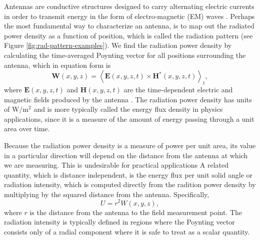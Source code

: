 Antennas are conductive structures designed to carry alternating electric currents in order to transmit energy in the form of electro-magnetic (EM) waves \cite{balanis2015antenna}. Perhaps the most fundamental way to characterize an antenna, is to map out the radiated power density as a function of position, which is called the radiation pattern (see Figure \ref{fig:rad-pattern-examples}). We find the radiation power density by calculating the time-averaged Poynting vector for all positions surrounding the antenna, which in equation form is
\begin{equation}
    \mathbf{W}(x,y,z) = \left<\mathbf{E}(x,y,z,t)\times\mathbf{H}^\ast(x,y,z,t)\right>_t,
\end{equation}
where $\mathbf{E}(x,y,z,t)$ and $\mathbf{H}(x,y,z,t)$ are the time-dependent electric and magnetic fields produced by the antenna \cite{jackson_classical_1999}. The radiation power density has units of $\mathrm{W}/\mathrm{m}^2$ and is more typically called the energy flux density in physics applications, since it is a measure of the amount of energy passing through a unit area over time. 

Because the radiation power density is a measure of power per unit area, its value in a particular direction will depend on the distance from the antenna at which we are measuring. This is undesirable for practical applications A related quantity, which is distance independent, is the energy flux per unit solid angle or radiation intensity, which is computed directly from the radition power density by multiplying by the squared distance from the antenna. Specifically,
\begin{equation}
    U = r^2W(x,y,z),
\end{equation}
where $r$ is the distance from the antenna to the field measurement point. The radiation intensity is typically defined in regions where the Poynting vector consists only of a radial component where it is safe to treat as a scalar quantity. 

